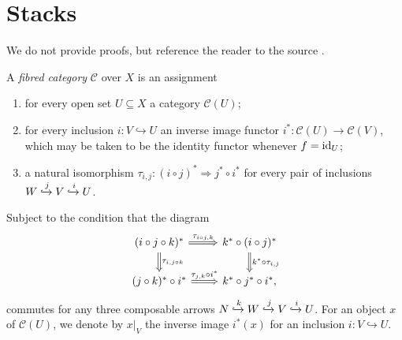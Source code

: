 \section{Stacks}\label{sec:stacks}
We do not provide proofs, but reference the reader to the source \cite[Exposé VI]{SGA1}.
\begin{definition}\label{def:fibred-category}
	A \textit{fibred category} $\mathcal{C}$ over $X$ is an assignment 
	\begin{enumerate}[label = (\roman*)]
		\item for every open set $U \subseteq X$ a category $\mathcal{C}(U)$;
		\item for every inclusion $i\colon V \hookrightarrow U$ an inverse image functor $i^{*}\colon \mathcal{C}(U) \to \mathcal{C}(V)$, which may be taken to be the identity functor whenever $f = \operatorname{id}_{U}$;
		\item a natural isomorphism $\tau_{i,j}\colon (i\circ j)^{*} \Rightarrow j^{*} \circ i^{*}$ for every pair of inclusions $W \xhookrightarrow{j} V \xhookrightarrow{i} U$.
	\end{enumerate}
	Subject to the condition that the diagram
	\begin{equation}\label{eqn:fibred-category-compatibility}
		\begin{tikzcd}
			(i\circ j \circ k)^{*} \ar[r, Rightarrow, "\tau_{i \circ j,k}"] \ar[d, Rightarrow, "\tau_{i, j\circ k}"] & k^{*}\circ(i \circ j)^{*} \ar[d, Rightarrow, "k^{*} \circ \tau_{i,j}"] \\
			(j\circ k)^{*} \circ i^{*} \ar[r, Rightarrow, "\tau_{j, k} \circ i^{*}"] & k^{*} \circ j^{*} \circ i^{*},
		\end{tikzcd}
	\end{equation}
	commutes for any three composable arrows $N \xhookrightarrow{k} W \xhookrightarrow{j} V \xhookrightarrow{i} U$. For an object $x$ of $\mathcal{C}(U)$, we denote by $x\lvert_{V}$ the inverse image $i^{*}(x)$ for an inclusion $i\colon V \hookrightarrow U$.
\end{definition}
